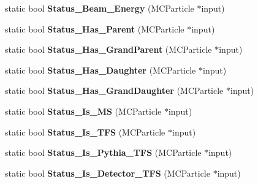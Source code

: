 \begin{DoxyCompactItemize}
\item 
\hypertarget{classToolSet_1_1CMC_a3ebc24c0c160ba37054b294059f09d96}{
static bool {\bfseries Status\_\-Beam\_\-Energy} (MCParticle $\ast$input)}
\label{classToolSet_1_1CMC_a3ebc24c0c160ba37054b294059f09d96}

\item 
\hypertarget{classToolSet_1_1CMC_acd1cf4b7527b2e2bd194ad688b29b132}{
static bool {\bfseries Status\_\-Has\_\-Parent} (MCParticle $\ast$input)}
\label{classToolSet_1_1CMC_acd1cf4b7527b2e2bd194ad688b29b132}

\item 
\hypertarget{classToolSet_1_1CMC_a88ff52dd7c66369b43eb8619a1383e7d}{
static bool {\bfseries Status\_\-Has\_\-GrandParent} (MCParticle $\ast$input)}
\label{classToolSet_1_1CMC_a88ff52dd7c66369b43eb8619a1383e7d}

\item 
\hypertarget{classToolSet_1_1CMC_a1771a4a8936446f9dfe5f9d22b5d9322}{
static bool {\bfseries Status\_\-Has\_\-Daughter} (MCParticle $\ast$input)}
\label{classToolSet_1_1CMC_a1771a4a8936446f9dfe5f9d22b5d9322}

\item 
\hypertarget{classToolSet_1_1CMC_a79d54fb4529c17a59ab21a51b3f6889c}{
static bool {\bfseries Status\_\-Has\_\-GrandDaughter} (MCParticle $\ast$input)}
\label{classToolSet_1_1CMC_a79d54fb4529c17a59ab21a51b3f6889c}

\item 
\hypertarget{classToolSet_1_1CMC_ae0ceba81f34f1a164b1d8ce719c92e05}{
static bool {\bfseries Status\_\-Is\_\-MS} (MCParticle $\ast$input)}
\label{classToolSet_1_1CMC_ae0ceba81f34f1a164b1d8ce719c92e05}

\item 
\hypertarget{classToolSet_1_1CMC_a662c5f9d64c7916f988e4ff15598d4ed}{
static bool {\bfseries Status\_\-Is\_\-TFS} (MCParticle $\ast$input)}
\label{classToolSet_1_1CMC_a662c5f9d64c7916f988e4ff15598d4ed}

\item 
\hypertarget{classToolSet_1_1CMC_aef5a206838a69936e98ea22a1c36e143}{
static bool {\bfseries Status\_\-Is\_\-Pythia\_\-TFS} (MCParticle $\ast$input)}
\label{classToolSet_1_1CMC_aef5a206838a69936e98ea22a1c36e143}

\item 
\hypertarget{classToolSet_1_1CMC_a23a38c3094037dd6660223494c8a5827}{
static bool {\bfseries Status\_\-Is\_\-Detector\_\-TFS} (MCParticle $\ast$input)}
\label{classToolSet_1_1CMC_a23a38c3094037dd6660223494c8a5827}


\end{DoxyCompactItemize}
